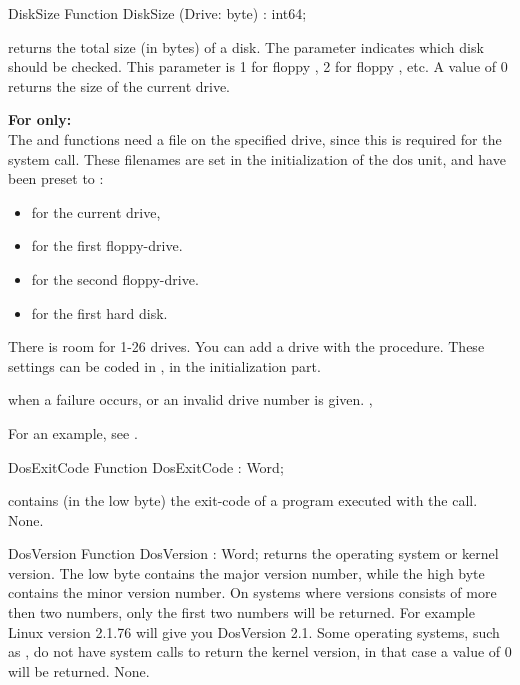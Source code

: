 \begin{function}{DiskSize}
\Declaration
Function DiskSize (Drive: byte) : int64;
\Description

 returns the total size (in bytes) of a disk. The parameter
 indicates which disk should be checked. This parameter is 1 for
floppy , 2 for floppy , etc. A value of 0 returns the size
of the current drive. 

\textbf{For \unix only:}\\
The  and  functions need a file on the specified drive, since this
is required for the  system call.
  These filenames are set in the initialization of the dos unit, and have 
been preset to :
\begin{itemize}
\item {} for the current drive, 
\item {} for the first floppy-drive.
\item {} for the second floppy-drive.
\item {} for the first hard disk.
\end{itemize}
There is room for 1-26 drives. You can add a drive with the
 procedure.
These settings can be coded in , in the initialization part.

 when a failure occurs, or an invalid drive number is given.
\SeeAlso
{}, 
\end{function}
For an example, see .
\begin{function}{DosExitCode}
\Declaration
Function DosExitCode  : Word;
\Description

 contains (in the low byte) the exit-code of a program 
executed with the  call.
\Errors
None.
\SeeAlso
{}
\end{function}


\begin{function}{DosVersion}
\Declaration
Function DosVersion  : Word;
\Description
{} returns the operating system or kernel version. The
low byte contains the major version number, while the high byte 
contains the minor version number.
\Portability
On systems where versions consists of more then two numbers, 
only the first two numbers will be returned. For example Linux version 2.1.76 
will give you DosVersion 2.1. Some operating systems, such as \freebsd, do not
have system calls to return the kernel version, in that case a value of 0 will
be returned.
\Errors
None.
\SeeAlso

\end{function}


